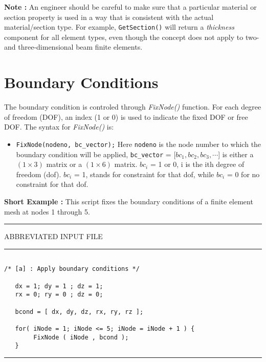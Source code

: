 \vspace{0.15 in}\noindent
{\bf Note :} An engineer should be careful to make sure that a particular
material or section property is used in a way that is consistent
with the actual material/section type. For example,
{\tt GetSection()} will return a {\it thickness} component
for all element types, even though the concept does not apply to
two- and three-dimensional beam finite elements.

\section{Boundary Conditions}

\vspace{0.15 in}
\noindent\hspace{0.5 in}
The boundary condition is controled through {\em FixNode()} function.
For each degree of freedom (DOF), an index (1 or 0) is used to
indicate the fixed DOF or free DOF. The syntax for {\em FixNode()} is:

\begin{itemize}
\item{}
{\tt FixNode(nodeno}{\tt , bc\_vector);}
Here {\tt nodeno} is the node number to which the
boundary condition will be applied,
{\tt bc\_vector} = [$bc_1, bc_2, bc_3,\cdots$] is either a $(1 \times 3)$ matrix
or a $( 1 \times 6)$ matrix.
$bc_i$ = 1 or 0, i is the ith degree of freedom (dof).
$bc_i$ = 1, stands for constraint for that dof,
while  $bc_i$ = 0 for no constraint for that dof.
\end{itemize}

\vspace{0.15 in}\noindent
{\bf Short Example :} This script fixes the boundary conditions of a finite
element mesh at nodes 1 through 5.

\vspace{0.15 in}
\begin{footnotesize}
\noindent
{\rule{2.1 in}{0.035 in} ABBREVIATED INPUT FILE \rule{2.1 in}{0.035 in} }
\begin{verbatim}

/* [a] : Apply boundary conditions */

   dx = 1; dy = 1 ; dz = 1;
   rx = 0; ry = 0 ; dz = 0;

   bcond = [ dx, dy, dz, rx, ry, rz ];

   for( iNode = 1; iNode <= 5; iNode = iNode + 1 ) {
        FixNode ( iNode , bcond );
   }
\end{verbatim}
\rule{6.25 in}{0.035 in}
\end{footnotesize}

